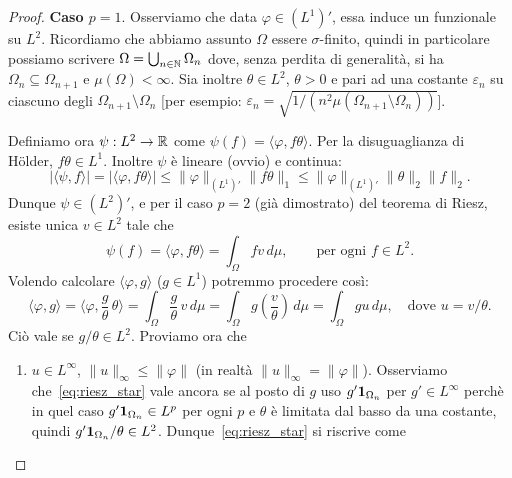 \begin{proof}
	\textbf{Caso $p=1$}. Osserviamo che data $\varphi \in (L^1)'$, essa induce un funzionale su $L^2$. Ricordiamo che abbiamo assunto $\Omega$ essere $\sigma$-finito, quindi in particolare possiamo scrivere $\Omega = \bigcup_{n \in \mathbb{N}} \Omega_n$ dove, senza perdita di generalità, si ha $\Omega_n \subseteq \Omega_{n+1}$ e $\mu(\Omega) < \infty$.
	Sia inoltre $\theta \in L^2$, $\theta > 0$ e pari ad una costante $\varepsilon_n$ su ciascuno degli $\Omega_{n+1} \setminus \Omega_n$ [per esempio: $\varepsilon_n = \sqrt{1/(n^2 \mu(\Omega_{n+1}\setminus \Omega_n))}$].

	Definiamo ora $\psi : L^2 \to \mathbb{R}$ come $\psi(f) = \langle \varphi, f \theta \rangle$. Per la disuguaglianza di H\"older, $f\theta \in L^1$. Inoltre $\psi$ è lineare (ovvio) e continua:
	\begin{equation}
	\label{eq:riesz_norm}
		|\langle \psi, f \rangle|=|\langle \varphi, f\theta\rangle| \leq \|\varphi\|_{(L^1)'} \|f\theta\|_1 \leq \|\varphi\|_{(L^1)'}\|\theta\|_2\|f\|_2.
	\end{equation}
	Dunque $\psi \in (L^2)'$, e per il caso $p=2$ (già dimostrato) del teorema di Riesz, esiste unica $v \in L^2$ tale che
	\begin{equation*}
		\psi(f) = \langle \varphi, f\theta \rangle = \int_\Omega fv \,d\mu, \qquad \text{per ogni $f \in L^2$}.
	\end{equation*}
	Volendo calcolare $\langle \varphi, g \rangle$ ($g \in L^1$) potremmo procedere così:
	\begin{equation}
	\label{eq:riesz_star}
		\langle \varphi, g \rangle = \langle \varphi, \frac{g}\theta\, \theta \rangle
		= \int_\Omega \frac{g}\theta\, v \,d\mu
		= \int_\Omega g \left( \frac{v}\theta \right)\,d\mu
		= \int_\Omega gu\,d\mu, \quad \text{dove $u = v/\theta$}.
	\end{equation}
	Ciò vale se $g/\theta \in L^2$. Proviamo ora che
	\begin{enumerate}
		\item $u \in L^\infty$, $\|u\|_\infty \leq \|\varphi\|$ (in realtà $\|u\|_\infty = \|\varphi\|$). %
		Osserviamo che~\eqref{eq:riesz_star} vale ancora se al posto di $g$ uso $g' {\boldsymbol{1}}_{\Omega_n}$ per $g' \in L^\infty$ perchè in quel caso $g' {\boldsymbol{1}}_{\Omega_n} \in L^p$ per ogni $p$ e $\theta$ è limitata dal basso da una costante, quindi $g' {\boldsymbol{1}}_{\Omega_n}/\theta \in L^2$. Dunque~\eqref{eq:riesz_star} si riscrive come

\end{enumerate}
\end{proof}
